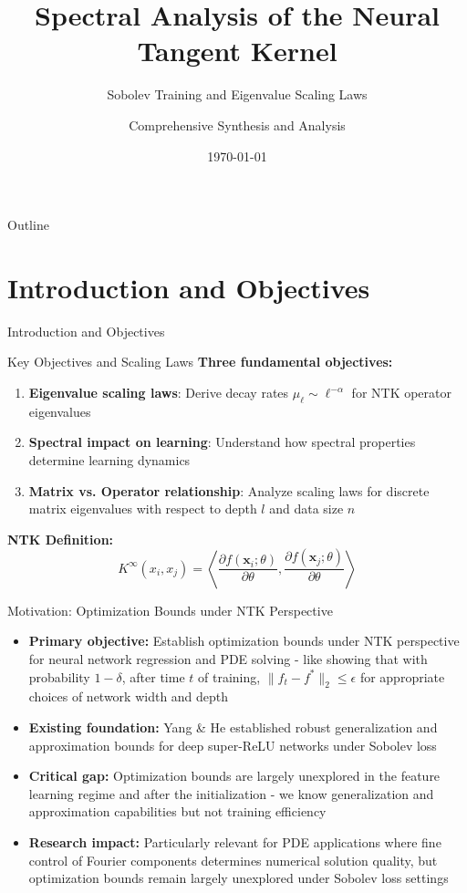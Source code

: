 \documentclass{beamer}
\title{Spectral Analysis of the Neural Tangent Kernel}
\subtitle{Sobolev Training and Eigenvalue Scaling Laws}
\author{Comprehensive Synthesis and Analysis}
\date{\today}
\begin{document}
\begin{frame}
\titlepage
\end{frame}

\begin{frame}{Outline}
\tableofcontents
\end{frame}

\section{Introduction and Objectives}

\begin{frame}
\begin{center}
\huge{Introduction and Objectives}
\end{center}
\end{frame}

\begin{frame}{Key Objectives and Scaling Laws}
\textbf{Three fundamental objectives:}
\begin{enumerate}
\item \textbf{Eigenvalue scaling laws}: Derive decay rates $\mu_\ell \sim \ell^{-\alpha}$ for NTK operator eigenvalues
\item \textbf{Spectral impact on learning}: Understand how spectral properties determine learning dynamics
\item \textbf{Matrix vs. Operator relationship}: Analyze scaling laws for discrete matrix eigenvalues with respect to depth $l$ and data size $n$
\end{enumerate}

\textbf{NTK Definition:}
$$K^{\infty}(x_i, x_j) = \left\langle \frac{\partial f(\mathbf{x}_i; \theta)}{\partial \theta}, \frac{\partial f(\mathbf{x}_j; \theta)}{\partial \theta} \right\rangle$$
\end{frame}

\begin{frame}{Motivation: Optimization Bounds under NTK Perspective}
\begin{itemize}
\item \textbf{Primary objective:} Establish optimization bounds under NTK perspective for neural network regression and PDE solving - like showing that with probability $1-\delta$, after time $t$ of training, $\|f_t - f^*\|_2 \leq \epsilon$ for appropriate choices of network width and depth

\item \textbf{Existing foundation:} Yang \& He established robust generalization and approximation bounds for deep super-ReLU networks under Sobolev loss

\item \textbf{Critical gap:} Optimization bounds are largely unexplored in the feature learning regime and after the initialization - we know generalization and approximation capabilities but not training efficiency
\item \textbf{Research impact:} Particularly relevant for PDE applications where fine control of Fourier components determines numerical solution quality, but optimization bounds remain largely unexplored under Sobolev loss settings
\end{itemize}
\end{frame}
\end{document}
